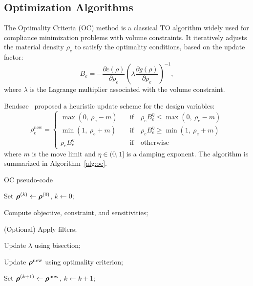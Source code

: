 \documentclass[mathpazo]{cicp}
\begin{document}
\subsection{Optimization Algorithms}
The Optimality Criteria (OC) method is a classical TO algorithm widely used for compliance minimization problems with volume constraints. It iteratively adjusts the material density $\rho_e$ to satisfy the optimality conditions, based on the update factor:
\begin{equation*}
	B_e = -\frac{\partial{c}(\rho)}{\partial\rho_e}\left(\lambda\frac{\partial{g}(\rho)}{\partial\rho_e}\right)^{-1},
\end{equation*}
where $\lambda$ is the Lagrange multiplier associated with the volume constraint.
 
Bendsøe~\cite{bendsoe1995optimization} proposed a heuristic update scheme for the design variables:
\begin{equation*}
	\rho_e^{\text{new}}=
	\begin{cases}
		\max(0,~\rho_e-m)\quad&\text{if}\quad \rho_eB_e^\eta\leq\max(0,~\rho_e-m)\\
		\min(1,~\rho_e+m)\quad&\text{if}\quad\rho_eB_e^\eta \geq \min(1,~\rho_e+m)\\
		\rho_eB_e^\eta\quad&\text{if}\quad\text{otherwise}
	\end{cases}
\end{equation*}
where $m$ is the move limit and $\eta\in(0,1]$ is a damping exponent. The algorithm is summarized in Algorithm~\ref{alg:oc}.
\begin{algorithm}[htbp]
	\caption{OC pseudo-code}
	\label{alg:oc}
	\begin{minipage}{\textwidth}
		Set \(\boldsymbol{\rho}^{(k)} \leftarrow \boldsymbol{\rho}^{(0)}\), \(k \leftarrow 0\);
		
		{
			Compute objective, constraint, and sensitivities;
			
			(Optional) Apply filters;
			
			Update \(\lambda\) using bisection;
			
			Update \(\boldsymbol{\rho}^{\text{new}}\) using optimality criterion;
			
			Set \(\boldsymbol{\rho}^{(k+1)} \leftarrow \boldsymbol{\rho}^{\text{new}}\), \(k \leftarrow k + 1\);
		}
	\end{minipage}
\end{algorithm}
\end{document}
